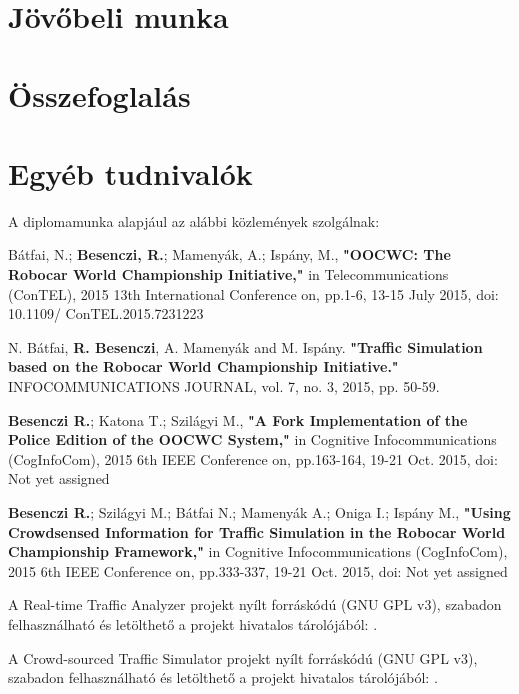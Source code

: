 \documentclass[a4paper,12pt]{report}
\begin{document}
\chapter{Jövőbeli munka}


\chapter{Összefoglalás}





\chapter*{Egyéb tudnivalók}

A diplomamunka alapjául az alábbi közlemények szolgálnak:

Bátfai, N.; {\bf{Besenczi, R.}}; Mamenyák, A.; Ispány, M., {\bf{"OOCWC: The Robocar World Championship Initiative,"}} in Telecommunications (ConTEL), 2015 13th International Conference on, pp.1-6, 13-15 July 2015, doi: 10.1109/ ConTEL.2015.7231223

N. Bátfai, {\bf{R. Besenczi}}, A. Mamenyák and M. Ispány. {\bf{"Traffic Simulation based on the Robocar World Championship Initiative."}} INFOCOMMUNICATIONS JOURNAL, vol. 7, no. 3, 2015, pp. 50-59.

{\bf{Besenczi R.}}; Katona T.; Szilágyi M., {\bf{"A Fork Implementation of the Police Edition of the OOCWC System,"}} in Cognitive Infocommunications (CogInfoCom), 2015 6th IEEE Conference on, pp.163-164, 19-21 Oct. 2015, doi: Not yet assigned

{\bf{Besenczi R.}}; Szilágyi M.; Bátfai N.; Mamenyák A.; Oniga I.; Ispány M., {\bf{"Using Crowdsensed Information for Traffic Simulation in the Robocar World Championship Framework,"}} in Cognitive Infocommunications (CogInfoCom), 2015 6th IEEE Conference on, pp.333-337, 19-21 Oct. 2015, doi: Not yet assigned

A Real-time Traffic Analyzer projekt nyílt forráskódú (GNU GPL v3), szabadon felhasználható és letölthető a projekt hivatalos tárolójából: \cite{rtta}.

A Crowd-sourced Traffic Simulator projekt nyílt forráskódú (GNU GPL v3), szabadon felhasználható és letölthető a projekt hivatalos tárolójából: \cite{csts}.
\end{document}
